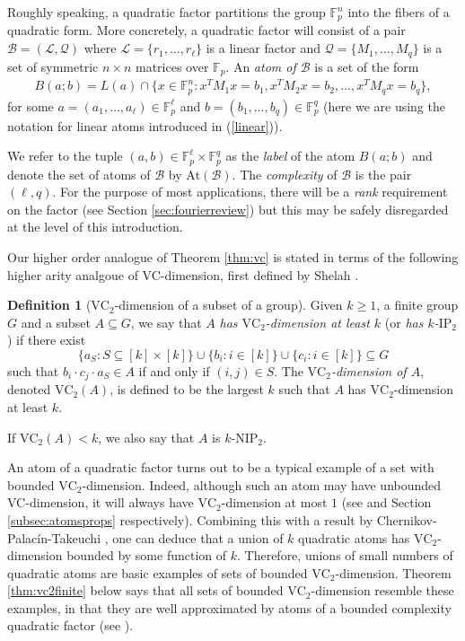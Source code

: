 \documentclass[12pt,oneside,british,a4wide]{amsart}
\numberwithin{equation}{section}
\theoremstyle{definition}
\newtheorem{definition}[theorem]{Definition}
\def\F{\mathbb{F}}
\def\IP{\mathrm{IP}}
\def\NIP{\mathrm{NIP}}
\def\VC{\mathrm{VC}}
\newcommand{\calL}{\mathcal{L}}
\newcommand{\calB}{\mathcal{B}}
\newcommand{\calQ}{\mathcal{Q}}
\newcommand{\At}{{\mathrm{At}}}
\begin{document}
Roughly speaking, a quadratic factor partitions the group $\F_p^n$ into the fibers of a quadratic form.  More concretely, a quadratic factor will consist of a pair $\calB=(\calL,\calQ)$ where $\calL=\{r_1,\ldots, r_{\ell}\}$ is a linear factor and $\calQ=\{M_1,\ldots, M_q\}$ is a set of symmetric $n\times n$ matrices over $\F_p$.  An \emph{atom of $\calB$} is a set of the form
\begin{align}\label{quad}
B(a;b)=L(a)\cap \{x \in \F_p^n: x^T M_1 x =b_1, x^T M_2 x =b_2,\dots, x^T M_q x =b_q \},
\end{align}
for some $a=(a_1,\dots,a_\ell)\in \F_p^{\ell}$ and $b=(b_1,\ldots,b_q)\in \F_p^q$ (here we are using the notation for linear atoms introduced in (\ref{linear})).

We refer to the tuple $(a,b)\in \F_p^{\ell}\times \F_p^q$ as the \emph{label} of the atom $B(a;b)$ and denote  the set of atoms of $\calB$  by $\At(\calB)$.    The \emph{complexity} of $\calB$ is the pair $(\ell,q)$. For the purpose of most applications, there will be a \emph{rank} requirement on the factor (see Section \ref{sec:fourierreview}) but this may be safely disregarded at the level of this introduction.

Our higher order analogue of Theorem \ref{thm:vc} is stated in terms of the following higher arity analgoue of VC-dimension,  first defined by Shelah \cite{Shelah.2017}.



\begin{definition}[$\VC_2$-dimension of a subset of a group]\label{def:vc2dim}
Given $k\geq 1$, a finite group $G$ and a subset $A\subseteq G$, we say that $A$ \emph{has $\VC_2$-dimension at least $k$}  (or \emph{has $k$-$\IP_2$}) if there exist 
$$
\{a_S: S\subseteq [k]\times [k]\}\cup \{b_{i}:i\in [k]\}\cup \{c_i: i\in [k]\}\subseteq G
$$
 such that $b_i\cdot c_j\cdot a_S\in A$ if and only if $(i,j)\in S$.  The \emph{$\VC_2$-dimension of $A$}, denoted $\VC_2( A)$, is defined to be the largest $k$ such that $A$ has $\VC_2$-dimension at least $k$.
 
If $\VC_2(A)<k$, we also say that $A$ is $k$-$\NIP_2$.
\end{definition}

An atom of a quadratic factor turns out to be a typical example of a set with bounded $\VC_2$-dimension. Indeed, although such an atom may have unbounded VC-dimension, it will always have $\VC_2$-dimension at most $1$ (see \cite[Lemma 3.9]{Terry.2021d} and Section \ref{subsec:atomsprops} respectively).  Combining this with a result by Chernikov-Palac\'{i}n-Takeuchi \cite{Chernikov.2019}, one can deduce that a union of $k$ quadratic atoms has $\VC_2$-dimension bounded by some function of $k$.  Therefore,  unions of small numbers of quadratic atoms are basic examples of sets of bounded $\VC_2$-dimension. Theorem \ref{thm:vc2finite} below says that all sets of bounded $\VC_2$-dimension resemble these examples, in that they are well approximated by atoms of a bounded complexity quadratic factor  (see \cite[Theorem 1.9 and Corollary 1.10]{Terry.2021d}). 
\end{document}
